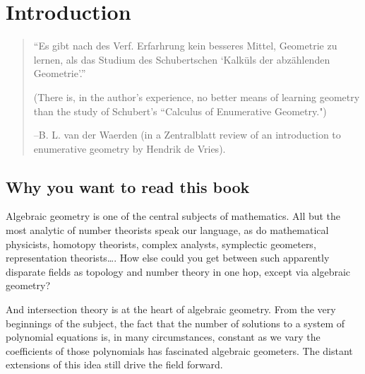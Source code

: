 

\setlength{\parskip}{5pt}

\addtocounter{chapter}{-1}
\chapter{Introduction}
\label{IntroChapter}

\begin{quote}
\small\sf
``Es gibt nach des Verf. Erfarhrung kein besseres Mittel, Geometrie zu lernen, als
das Studium des Schubertschen `Kalk\"uls der abz\"ahlenden Geometrie'.''

(There is, in the author's experience, no better means of learning geometry than
the study of Schubert's ``Calculus of Enumerative Geometry.")

--B. L. van der Waerden (in a Zentralblatt review of an introduction to enumerative geometry
by Hendrik de Vries).
\bigskip

\end{quote}

%


\section{Why you want to read this book}

Algebraic geometry is one of the central subjects of mathematics. All but the most analytic of number theorists speak our language, as do mathematical physicists, homotopy theorists, complex analysts, symplectic geometers, representation theorists\dots. How else could you get between such apparently disparate fields as topology and number theory in one hop, except via algebraic geometry?

And intersection theory is at the heart of algebraic geometry. From the very beginnings of the subject, the fact that the number of solutions to a system of polynomial equations is, in many circumstances, constant as we vary the coefficients of those polynomials has fascinated algebraic geometers. The distant extensions of this idea still drive the field forward.

